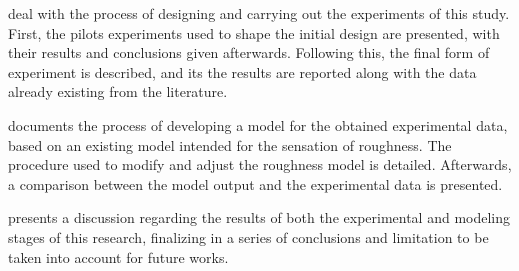 \documentclass[../main.tex]{subfiles}
\begin{document}
 deal with the process of designing and carrying
out the experiments of this study. First, the pilots experiments used to shape
the initial design are presented, with their results and conclusions given
afterwards. Following this, the final form of experiment is described, and its
the results are reported along with the data already existing from the
literature.

 documents the process of developing a model for the obtained
experimental data, based on an existing model intended for the sensation of
roughness. The procedure used to modify and adjust the roughness model is
detailed. Afterwards, a comparison between the model output and the
experimental data is presented.

 presents a discussion regarding the results of both the
experimental and modeling stages of this research, finalizing in a series of
conclusions and limitation to be taken into account for future works.
\end{document}
